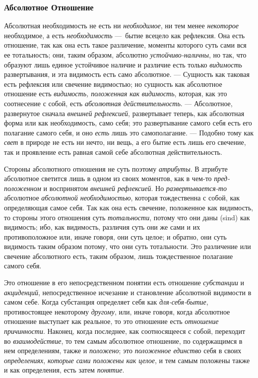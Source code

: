 \subsubsection[Третья главаАбсолютное
Отношение]{\newline
Абсолютное Отношение}
\hypertarget{Toc478978768}{}Абсолютная необходимость не есть ни
{\em необходимое}, ни тем менее
{\em некоторое} необходимое, а есть
{\em необходимость} —~бытие всецело как рефлексия. Она
есть отношение, так как она есть такое различение, моменты которого суть
сами вся ее тотальность; они, таким образом, абсолютно
{\em устойчиво-наличны}, но так, что образуют лишь
единое устойчивое наличие и различие есть только
{\em видимость} развертывания, и эта видимость есть
само абсолютное. — Сущность как таковая есть рефлексия или свечение
видимостью; но сущность как абсолютное отношение есть
{\em видимость, положенная как
}{\em видимость}, которая, как это соотнесение с собой,
есть {\em абсолютная действительность}. — Абсолютное,
развернутое сначала {\em внешней рефлексией},
развертывает теперь, как абсолютная форма или как необходимость, само себя;
это развертывание самого себя есть его полагание самого себя, и оно
{\em есть} лишь это самополагание. — Подобно тому как
{\em свет} в природе не есть ни нечто, ни вещь, а его
бытие есть лишь его свечение, так и проявление есть равная самой себе
абсолютная действительность.

Стороны абсолютного отношения не суть поэтому
{\em атрибуты}. В атрибуте абсолютное светится лишь в
одном из своих моментов, как в чем-то
{\em пред-положенном} и воспринятом
{\em внешней рефлексией}. Но
{\em развертывается-то} абсолютное
{\em абсолютной необходимостью}, которая тождественна с
собой, как определяющая самое себя. Так как она есть свечение, положенное
как видимость, то стороны этого отношения суть
{\em тотальности}, потому что они даны (sind) как
видимость; ибо, как видимость, различия суть они же сами и их
противоположное или, иначе говоря, они суть целое; и обратно, они суть
видимость таким образом потому, что они суть тотальности. Это различение
или свечение абсолютного есть, таким образом, лишь тождественное полагание
самого себя.

Это отношение в его непосредственном понятии есть отношение
{\em субстанции} и
{\em акциденций}, непосредственное исчезание и
становление абсолютной видимости в самом себе. Когда субстанция определяет
себя как {\em для-себя-бытие}, противостоящее
некоторому {\em другому}, или, иначе говоря, когда
абсолютное отношение выступает как реальное, то это отношение есть
{\em отношение причинности}. Наконец, когда последнее,
как соотносящееся с собой, переходит во
{\em взаимодействие}, то тем самым абсолютное
отношение, по содержащимся в нем определениям, также и
{\em положено}; это {\em положенное
единство} себя в своих {\em определениях},
{\em которые сами положены как целое}, и тем самым
положены также и как определения, есть затем
{\em понятие}.

